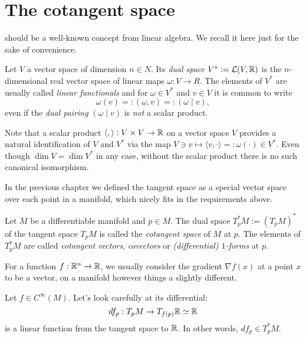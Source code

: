\section{The cotangent space}

 should be a well-known concept from linear algebra. We recall it here just for the sake of convenience.

\begin{definition}
  Let $V$ a vector space of dimension $n\in N$.
  Its \emph{dual space} $V^* := \mathcal{L}(V, \mathbb{R})$ is the $n$-dimensional real vector space of linear maps $\omega:V \to R$.
  The elements of $V^*$ are usually called \emph{linear functionals} and for $\omega\in V^*$ and $v\in V$ it is common to write
  \begin{equation}
    \omega(v) =: (\omega, v) =: (\omega \mid v),
  \end{equation}
  even if the \emph{dual pairing} $(\omega \mid v)$ is \emph{not} a scalar product.
\end{definition}

\begin{remark}\label{rmk:identification}
  Note that a scalar product $\langle,\rangle :  V\times V \to \mathbb{R}$ on a vector space $V$ provides a natural identification of $V$ and $V^*$ via the map $V\ni v \mapsto \langle v, \cdot \rangle =: \omega(\cdot) \in V^*$.
  Even though $\dim V = \dim V^*$ in any case, without the scalar product there is no such canonical isomorphism.
\end{remark}

In the previous chapter we defined the tangent space as a special vector space over each point in a manifold, which nicely fits in the requirements above.

\begin{definition}
  Let $M$ be a differentiable manifold and $p\in M$.
  The dual space $T_p^*M := (T_pM)^*$ of the tangent space $T_pM$ is called the \emph{cotangent space} of $M$ at $p$.
  The elements of $T^*_pM$ are called \emph{cotangent vectors}, \emph{covectors} or \emph{(differential) $1$-forms} at $p$.
\end{definition}

For a function $f:\mathbb{R}^n\to\mathbb{R}$, we usually consider the gradient $\nabla f(x)$ at a point $x$ to be a vector, on a manifold however things a slightly different.

\begin{example}
  Let $f\in C^\infty(M)$. Let's look carefully at its differential:
  \begin{equation}
    df_p: T_p M \to T_{f(p)}\mathbb{R} \simeq \mathbb{R}
  \end{equation}
  is a linear function from the tangent space to $\mathbb{R}$.
  In other words, $df_p \in T_p^* M$.
\end{example}

